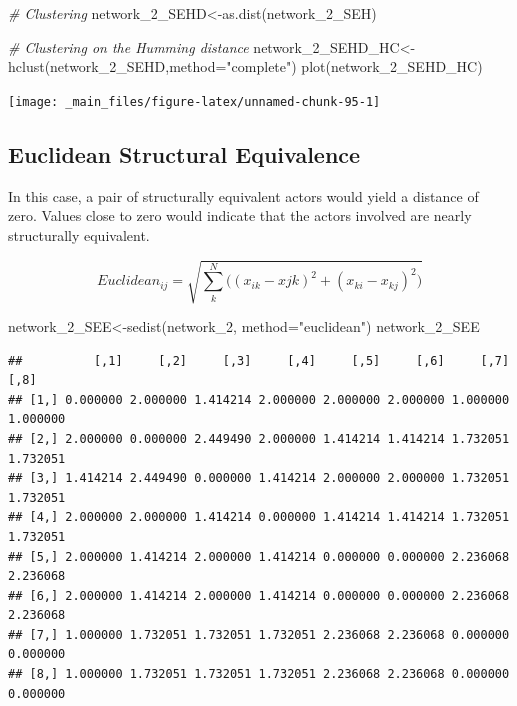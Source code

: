 \documentclass[
  notitlepage,
  onecolumn,
  openany]{book}
\newenvironment{Shaded}{\begin{snugshade}}{\end{snugshade}}
\newcommand{\AttributeTok}[1]{\textcolor[rgb]{0.77,0.63,0.00}{#1}}
\newcommand{\CommentTok}[1]{\textcolor[rgb]{0.56,0.35,0.01}{\textit{#1}}}
\newcommand{\FunctionTok}[1]{\textcolor[rgb]{0.00,0.00,0.00}{#1}}
\newcommand{\NormalTok}[1]{#1}
\newcommand{\OtherTok}[1]{\textcolor[rgb]{0.56,0.35,0.01}{#1}}
\newcommand{\StringTok}[1]{\textcolor[rgb]{0.31,0.60,0.02}{#1}}
\begin{document}
\begin{Shaded}
\begin{Highlighting}[]
\CommentTok{\# Clustering}
\NormalTok{network\_2\_SEHD}\OtherTok{\textless{}{-}}\FunctionTok{as.dist}\NormalTok{(network\_2\_SEH)}

\CommentTok{\# Clustering on the Humming distance}
\NormalTok{network\_2\_SEHD\_HC}\OtherTok{\textless{}{-}}\FunctionTok{hclust}\NormalTok{(network\_2\_SEHD,}\AttributeTok{method=}\StringTok{"complete"}\NormalTok{)}
\FunctionTok{plot}\NormalTok{(network\_2\_SEHD\_HC)}
\end{Highlighting}
\end{Shaded}

\texttt{[image: \_main\_files/figure-latex/unnamed-chunk-95-1]}

\hypertarget{euclidean-structural-equivalence}{%
\subsection{Euclidean Structural Equivalence}\label{euclidean-structural-equivalence}}

In this case, a pair of structurally equivalent actors would yield a distance of zero. Values close to zero would indicate that the actors involved are nearly structurally equivalent.

\[
Euclidean_{ij} = \sqrt{\sum_k^N \Big((x_{ik}-x{jk})^2+(x_{ki}-x_{kj})^2\Big)}
\]

\begin{Shaded}
\begin{Highlighting}[]
\NormalTok{network\_2\_SEE}\OtherTok{\textless{}{-}}\FunctionTok{sedist}\NormalTok{(network\_2, }\AttributeTok{method=}\StringTok{"euclidean"}\NormalTok{)}
\NormalTok{network\_2\_SEE}
\end{Highlighting}
\end{Shaded}

\begin{verbatim}
##          [,1]     [,2]     [,3]     [,4]     [,5]     [,6]     [,7]     [,8]
## [1,] 0.000000 2.000000 1.414214 2.000000 2.000000 2.000000 1.000000 1.000000
## [2,] 2.000000 0.000000 2.449490 2.000000 1.414214 1.414214 1.732051 1.732051
## [3,] 1.414214 2.449490 0.000000 1.414214 2.000000 2.000000 1.732051 1.732051
## [4,] 2.000000 2.000000 1.414214 0.000000 1.414214 1.414214 1.732051 1.732051
## [5,] 2.000000 1.414214 2.000000 1.414214 0.000000 0.000000 2.236068 2.236068
## [6,] 2.000000 1.414214 2.000000 1.414214 0.000000 0.000000 2.236068 2.236068
## [7,] 1.000000 1.732051 1.732051 1.732051 2.236068 2.236068 0.000000 0.000000
## [8,] 1.000000 1.732051 1.732051 1.732051 2.236068 2.236068 0.000000 0.000000
\end{verbatim}
\end{document}
